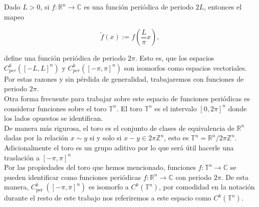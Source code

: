 \documentclass[12pt]{article}
\newcommand\T{\mathbb{T}}
\begin{document}
Dado $L>0$, si $f: \mathbb{R}^n \rightarrow \mathbb{C}$ es una función periódica de periodo $2 L$, entonces el mapeo

$$
\widetilde{f}(x):=f\left(\frac{L}{\pi} x\right),
$$

define una función periódica de periodo $2 \pi$. Esto es, que los espacios $C_{p e r}^k([-L, L]^n)$ y $C_{p e r}^k([-\pi, \pi]^n)$ son isomorfos como espacios vectoriales. Por estas razones y sin pérdida de generalidad, trabajaremos con funciones de periodo $2\pi$.\\

Otra forma frecuente para trabajar sobre este espacio de funciones periódicas es considerar funciones sobre  el toro $\mathbb{T}^n$. El toro $\mathbb{T}^n$ es el intervalo $[0,2 \pi]^n$ donde los lados opuestos se identifican.\\

De manera más rigurosa, el toro es el conjunto de clases de equivalencia de $\mathbb{R}^n$ dadas por la relación $x \sim y$ si y solo si $x-y \in 2 \pi \mathbb{Z}^n$, esto es $\mathbb{T}^n=\mathbb{R}^n/ 2 \pi \mathbb{Z}^n$. Adicionalmente el toro es un grupo aditivo por lo que será útil hacerle una traslación a $[-\pi,\pi]^n$\\

Por las propiedades del toro que hemos mencionado, funciones $f: \mathbb{T}^n \rightarrow \mathbb{C}$ se pueden identificar como funciones periódicas $f: \mathbb{R}^n \rightarrow \mathbb{C}$ con periodo $2 \pi$. De esta manera, $C_{\text {per }}^k([-\pi, \pi]^n)$ es isomorfo a $C^k(\mathbb{T}^n)$, por comodidad en la notación durante el resto de  este trabajo nos referiremos a este espacio como $C^k(\T^n)$. \cite{ogrianoc}\\
\end{document}
